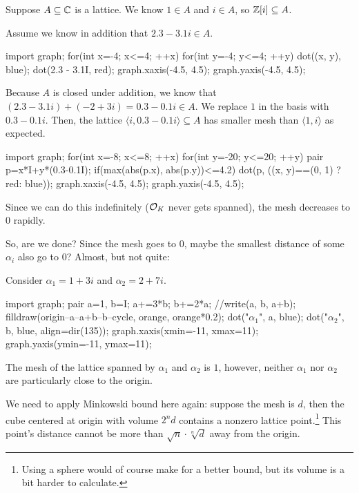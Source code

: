 \begin{example}
	Suppose $A \subseteq \mathbb C$ is a lattice. We know $1 \in A$ and $i \in A$,
	so $\mathbb Z[i] \subseteq A$.

	Assume we know in addition that $2.3 - 3.1i \in A$.
	\begin{center}
		\begin{asy}
			import graph;
			for(int x=-4; x<=4; ++x){
				for(int y=-4; y<=4; ++y){
					dot((x, y), blue);
				}
			}
			dot(2.3 - 3.1I, red);
			graph.xaxis(-4.5, 4.5);
			graph.yaxis(-4.5, 4.5);
		\end{asy}
	\end{center}

	Because $A$ is closed under addition, we know that $(2.3 - 3.1i) + (-2 + 3i) = 0.3-0.1i \in A$.
	We replace $1$ in the basis with $0.3-0.1i$.
	Then, the lattice $\langle i, 0.3-0.1i\rangle \subseteq A$ has smaller mesh than $\langle 1, i
	\rangle$ as expected.
	\begin{center}
		\begin{asy}
			import graph;
			for(int x=-8; x<=8; ++x){
				for(int y=-20; y<=20; ++y){
					pair p=x*I+y*(0.3-0.1I);
					if(max(abs(p.x), abs(p.y))<=4.2){
						dot(p, ((x, y)==(0, 1) ? red: blue));
					}
				}
			}
			graph.xaxis(-4.5, 4.5);
			graph.yaxis(-4.5, 4.5);
		\end{asy}
	\end{center}
\end{example}

Since we can do this indefinitely ($\mathcal O_K$ never gets spanned), the mesh decreases to $0$ rapidly.

So, are we done? Since the mesh goes to $0$, maybe the smallest distance of some $\alpha_i$ also go
to $0$? Almost, but not quite:
\begin{example}
	Consider $\alpha_1 = 1+3i$ and $\alpha_2 = 2+7i$.
	\begin{center}
		\begin{asy}
			import graph;
			pair a=1, b=I;
			a+=3*b;
			b+=2*a;
			//write(a, b, a+b);
			filldraw(origin--a--a+b--b--cycle, orange, orange*0.2);
			dot("$\alpha_1$", a, blue);
			dot("$\alpha_2$", b, blue, align=dir(135));
			graph.xaxis(xmin=-11, xmax=11);
			graph.yaxis(ymin=-11, ymax=11);
		\end{asy}
	\end{center}
	The mesh of the lattice spanned by $\alpha_1$ and $\alpha_2$ is $1$,
	however, neither $\alpha_1$ nor $\alpha_2$ are particularly close to the origin.
\end{example}
We need to apply Minkowski bound here again: suppose the mesh is $d$, then
the cube centered at origin with volume $2^n d$ contains a nonzero lattice point.\footnote{Using a
sphere would of course make for a better bound, but its volume is a bit harder to calculate.}
This point's distance cannot be more than $\sqrt{n} \cdot \sqrt[n]{d}$ away from the origin.

